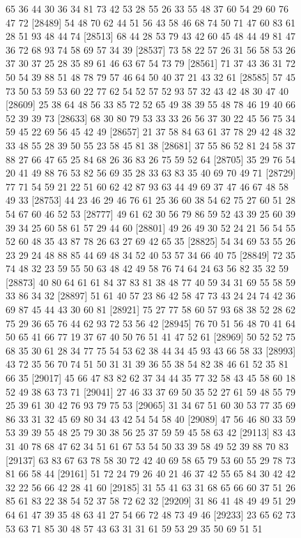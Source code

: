 \documentclass{article}
\begin{document}
\begin{figure}[H]
\begin{Schunk}
\begin{Soutput}
[28465] 65 36 44 30 36 34 81 73 42 53 28 55 26 33 55 48 37 60 54 29 60 76 47 72
[28489] 54 48 70 62 44 51 56 43 58 46 68 74 50 71 47 60 83 61 28 51 93 48 44 74
[28513] 68 44 28 53 79 43 42 60 45 48 44 49 81 47 36 72 68 93 74 58 69 57 34 39
[28537] 73 58 22 57 26 31 56 58 53 26 37 30 37 25 28 35 89 61 46 63 67 54 73 79
[28561] 71 37 43 36 31 72 50 54 39 88 51 48 78 79 57 46 64 50 40 37 21 43 32 61
[28585] 57 45 73 50 53 59 53 60 22 77 62 54 52 57 52 93 57 32 43 42 48 30 47 40
[28609] 25 38 64 48 56 33 85 72 52 65 49 38 39 55 48 78 46 19 40 66 52 39 39 73
[28633] 68 30 80 79 53 33 33 26 56 37 30 22 45 56 75 34 59 45 22 69 56 45 42 49
[28657] 21 37 58 84 63 61 37 78 29 42 48 32 33 48 55 28 39 50 55 23 58 45 81 38
[28681] 37 55 86 52 81 24 58 37 88 27 66 47 65 25 84 68 26 36 83 26 75 59 52 64
[28705] 35 29 76 54 20 41 49 88 76 53 82 56 69 35 28 33 63 83 35 40 69 70 49 71
[28729] 77 71 54 59 21 22 51 60 62 42 87 93 63 44 49 69 37 47 46 67 48 58 49 33
[28753] 44 23 46 29 46 76 61 25 36 60 38 54 62 75 27 60 51 28 54 67 60 46 52 53
[28777] 49 61 62 30 56 79 86 59 52 43 39 25 60 39 39 34 25 60 58 61 57 29 44 60
[28801] 49 26 49 30 52 24 21 56 54 55 52 60 48 35 43 87 78 26 63 27 69 42 65 35
[28825] 54 34 69 53 55 26 23 29 24 48 88 85 44 69 48 34 52 40 53 57 34 66 40 75
[28849] 72 35 74 48 32 23 59 55 50 63 48 42 49 58 76 74 64 24 63 56 82 35 32 59
[28873] 40 80 64 61 61 84 37 83 81 38 48 77 40 59 34 31 69 55 58 59 33 86 34 32
[28897] 51 61 40 57 23 86 42 58 47 73 43 24 24 74 42 36 69 87 45 44 43 30 60 81
[28921] 75 27 77 58 60 57 93 68 38 52 28 62 75 29 36 65 76 44 62 93 72 53 56 42
[28945] 76 70 51 56 48 70 41 64 50 65 41 66 77 19 37 67 40 50 76 51 41 47 52 61
[28969] 50 52 52 75 68 35 30 61 28 34 77 75 54 53 62 38 44 34 45 93 43 66 58 33
[28993] 43 72 35 56 70 74 51 50 31 31 39 36 55 38 54 82 38 46 61 52 35 81 66 35
[29017] 45 66 47 83 82 62 37 34 44 35 77 32 58 43 45 58 60 18 52 49 38 63 73 71
[29041] 27 46 33 37 69 50 35 52 27 61 59 48 55 79 25 39 61 30 42 76 93 79 75 53
[29065] 31 34 67 51 60 30 53 77 35 69 86 33 31 32 45 69 80 34 43 42 54 54 58 40
[29089] 47 56 46 80 33 59 53 39 39 55 48 25 79 30 38 56 25 37 59 59 45 58 63 42
[29113] 83 43 31 40 78 68 47 62 34 51 61 67 53 54 50 33 39 58 49 52 39 88 70 83
[29137] 63 83 67 63 78 58 30 72 42 40 69 58 65 79 53 60 55 29 78 73 81 66 58 44
[29161] 51 72 24 79 26 40 21 46 37 42 55 65 84 30 42 42 32 22 56 66 42 28 41 60
[29185] 31 55 41 63 31 68 65 66 60 37 51 26 85 61 83 22 38 54 52 37 58 72 62 32
[29209] 31 86 41 48 49 49 51 29 64 61 47 39 35 48 63 41 27 54 66 72 48 73 49 46
[29233] 23 65 62 73 53 63 71 85 30 48 57 43 63 31 31 61 59 53 29 35 50 69 51 51

\end{Soutput}
\end{Schunk}
\end{figure}
\end{document}
